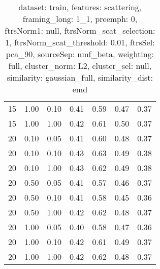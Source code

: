\begin{table}
\begin{center}
\begin{tabular}{lllcccc}
15 & 1.00 & 0.10 & 0.41 & 0.59 & 0.47 & 0.37 \\ 
15 & 1.00 & 1.00 & 0.42 & 0.61 & 0.50 & 0.37 \\ 
20 & 0.10 & 0.05 & 0.41 & 0.60 & 0.48 & 0.37 \\ 
20 & 0.10 & 0.10 & 0.43 & 0.63 & 0.49 & 0.38 \\ 
20 & 0.10 & 1.00 & 0.43 & 0.62 & 0.49 & 0.38 \\ 
20 & 0.50 & 0.05 & 0.41 & 0.57 & 0.46 & 0.37 \\ 
20 & 0.50 & 0.10 & 0.41 & 0.58 & 0.45 & 0.36 \\ 
20 & 0.50 & 1.00 & 0.42 & 0.62 & 0.48 & 0.37 \\ 
20 & 1.00 & 0.05 & 0.40 & 0.58 & 0.47 & 0.36 \\ 
20 & 1.00 & 0.10 & 0.42 & 0.61 & 0.49 & 0.37 \\ 
20 & 1.00 & 1.00 & 0.42 & 0.62 & 0.48 & 0.37 \\ 
\end{tabular} 
\end{center} 
\caption{dataset: train, features: scattering, framing\_long: 1\_1, preemph: 0, ftrsNorm1: null, ftrsNorm\_scat\_selection: 1, ftrsNorm\_scat\_threshold: 0.01, ftrsSel: pca\_90, sourceSep: nmf\_beta, weighting: full, cluster\_norm: L2, cluster\_sel: null, similarity: gaussian\_full, similarity\_dist: emd} 
\label{datasetrFeaturscFraminlong1_1Preemp0Ftrsnorm1nuFtrsnoscatselect1Ftrsnoscatthresh0.01Ftrsselpc90SourcesepnmbeWeightfuClustenormL2ClusteselnuSimilagafuSimiladistem} 
\end{table} 
 
